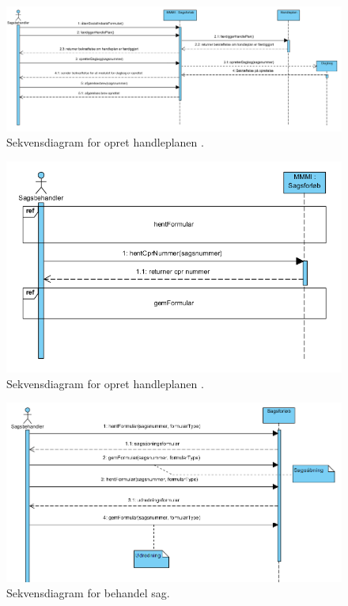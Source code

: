 \begin{figure}
  \includegraphics[width=\linewidth]{./PNG/sekDiaSagsforloebAfgoere.PNG} 
  \caption{Sekvensdiagram for opret handleplanen .}
  \label{fig:SagforAf}
\end{figure}

\begin{figure}
  \includegraphics[width=\linewidth]{./PNG/sekDiaSagsforloebIndhent.PNG} 
  \caption{Sekvensdiagram for opret handleplanen .}
  \label{fig:SagforInd}
\end{figure}

\begin{figure}
  \includegraphics[width=\linewidth]{./PNG/sekDiaBehandelSag.PNG} 
  \caption{Sekvensdiagram for behandel sag.}
  \label{fig:SagforInd}
\end{figure}


